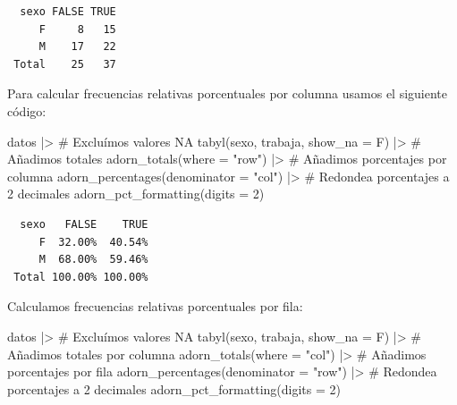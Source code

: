 \documentclass[
  spanish,
  letterpaper,
  DIV=11,
  numbers=noendperiod]{scrreprt}
\newenvironment{Shaded}{\begin{snugshade}}{\end{snugshade}}
\newcommand{\AttributeTok}[1]{\textcolor[rgb]{0.40,0.45,0.13}{#1}}
\newcommand{\CommentTok}[1]{\textcolor[rgb]{0.37,0.37,0.37}{#1}}
\newcommand{\DecValTok}[1]{\textcolor[rgb]{0.68,0.00,0.00}{#1}}
\newcommand{\FunctionTok}[1]{\textcolor[rgb]{0.28,0.35,0.67}{#1}}
\newcommand{\NormalTok}[1]{\textcolor[rgb]{0.00,0.23,0.31}{#1}}
\newcommand{\SpecialCharTok}[1]{\textcolor[rgb]{0.37,0.37,0.37}{#1}}
\newcommand{\StringTok}[1]{\textcolor[rgb]{0.13,0.47,0.30}{#1}}
\begin{document}
\begin{verbatim}
  sexo FALSE TRUE
     F     8   15
     M    17   22
 Total    25   37
\end{verbatim}

Para calcular frecuencias relativas porcentuales por columna usamos el
siguiente código:

\begin{Shaded}
\begin{Highlighting}[]
\NormalTok{datos }\SpecialCharTok{|\textgreater{}}
  \CommentTok{\# Excluímos valores NA}
  \FunctionTok{tabyl}\NormalTok{(sexo, trabaja, }\AttributeTok{show\_na =}\NormalTok{ F) }\SpecialCharTok{|\textgreater{}}
  \CommentTok{\# Añadimos totales}
  \FunctionTok{adorn\_totals}\NormalTok{(}\AttributeTok{where =} \StringTok{"row"}\NormalTok{) }\SpecialCharTok{|\textgreater{}}
  \CommentTok{\# Añadimos porcentajes por columna}
  \FunctionTok{adorn\_percentages}\NormalTok{(}\AttributeTok{denominator =} \StringTok{"col"}\NormalTok{) }\SpecialCharTok{|\textgreater{}}
  \CommentTok{\# Redondea porcentajes a 2 decimales}
  \FunctionTok{adorn\_pct\_formatting}\NormalTok{(}\AttributeTok{digits =} \DecValTok{2}\NormalTok{)}
\end{Highlighting}
\end{Shaded}

\begin{verbatim}
  sexo   FALSE    TRUE
     F  32.00%  40.54%
     M  68.00%  59.46%
 Total 100.00% 100.00%
\end{verbatim}

Calculamos frecuencias relativas porcentuales por fila:

\begin{Shaded}
\begin{Highlighting}[]
\NormalTok{datos }\SpecialCharTok{|\textgreater{}}
  \CommentTok{\# Excluímos valores NA}
  \FunctionTok{tabyl}\NormalTok{(sexo, trabaja, }\AttributeTok{show\_na =}\NormalTok{ F) }\SpecialCharTok{|\textgreater{}}
  \CommentTok{\# Añadimos totales por columna}
  \FunctionTok{adorn\_totals}\NormalTok{(}\AttributeTok{where =} \StringTok{"col"}\NormalTok{) }\SpecialCharTok{|\textgreater{}}
  \CommentTok{\# Añadimos porcentajes por fila}
  \FunctionTok{adorn\_percentages}\NormalTok{(}\AttributeTok{denominator =} \StringTok{"row"}\NormalTok{) }\SpecialCharTok{|\textgreater{}}
  \CommentTok{\# Redondea porcentajes a 2 decimales}
  \FunctionTok{adorn\_pct\_formatting}\NormalTok{(}\AttributeTok{digits =} \DecValTok{2}\NormalTok{)}
\end{Highlighting}
\end{Shaded}
\end{document}
